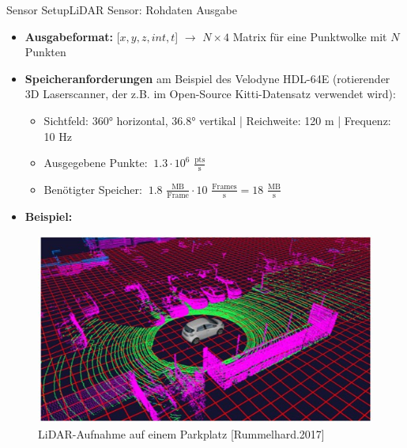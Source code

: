 \documentclass[169, handout	]{THIbeamer} %
\begin{document}
	\begin{frame}{Sensor Setup}{LiDAR Sensor: Rohdaten Ausgabe}
		\begin{itemize}
			\item \textbf{Ausgabeformat:} [$x, y, z, int, t$] $\rightarrow$ $N \times 4$ Matrix für eine Punktwolke mit $N$ Punkten
			\item \textbf{Speicheranforderungen} am Beispiel des Velodyne HDL-64E (rotierender 3D Laserscanner, der z.B. im  Open-Source Kitti-Datensatz verwendet wird):
			\begin{itemize}
				\item Sichtfeld: 360° horizontal, 36.8° vertikal | Reichweite: 120 m | Frequenz: 10 Hz
				\item Ausgegebene Punkte: $~ 1.3 \cdot 10^{6}$ $\frac{\text{pts}}{\text{s}}$ 
				\item Benötigter Speicher: $~1.8$ $\frac{\text{MB}}{\text{Frame}} \cdot 10$ $\frac{\text{Frames}}{\text{s}} = 18$  $\frac{\text{MB}}{\text{s}}$
			\end{itemize}			 
			\item \textbf{Beispiel:}
		\end{itemize}					
		\begin{figure}
			\includegraphics[scale=0.3]{required/LiDAR auf Parkplatz.jpg}
			\caption{LiDAR-Aufnahme auf einem Parkplatz [Rummelhard.2017]}
		\end{figure}
	\end{frame}
\end{document}
